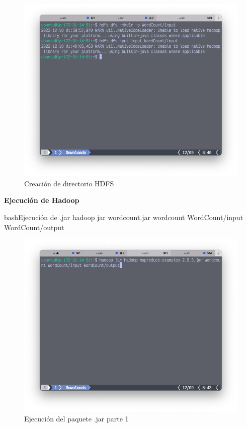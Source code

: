 \begin{figure}[h]
	\centering
	\includegraphics[scale=.28] {img/49-hdfs-dfs-mkdir-p-wordcount-input}
	\caption{Creación de directorio HDFS}
	\label{fig:49}	
\end{figure}


\textbf{Ejecución de Hadoop}

\begin{sourcecode}[]{bash}{Ejecución de .jar}
hadoop jar wordcount.jar wordcount WordCount/input WordCount/output
\end{sourcecode}

\begin{figure}[h]
	\centering
	\includegraphics[scale=.28] {img/50-wordcount-jar}
	\caption{Ejecución del paquete .jar parte 1}
	\label{fig:50}	
\end{figure}


